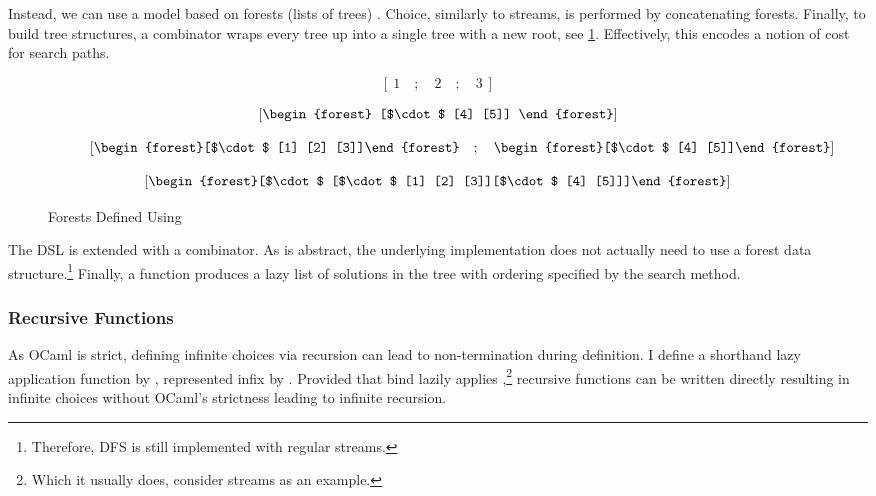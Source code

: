 Instead, we can use a model based on forests (lists of trees) \cite{Bunches}. Choice, similarly to streams, is performed by concatenating forests. Finally, to build tree structures, a  combinator wraps every tree up into a single tree with a new root, see \cref{fig:Wrap}. Effectively, this encodes a  notion of cost for search paths.

\begin{figure}[h]
\centering
\begin{subfigure}{0.45\textwidth}
\centering
\[\left[\ 1\quad ; \quad 2 \quad ; \quad 3\ \right]\]
\caption{  }
\end{subfigure}
\begin{subfigure}{0.45\textwidth}
\centering
\[\left[\vcenter{\hbox{\begin{forest}
[$\cdot$ [4] [5]]
\end{forest}}}\right]\]
\caption{}
\end{subfigure}
\begin{subfigure}{0.45\textwidth}
\centering
\[\left[\vcenter{\hbox{\begin{forest}[$\cdot$ [1] [2] [3]]\end{forest}}} \quad ; \quad\vcenter{\hbox{\begin{forest}[$\cdot$ [4] [5]]\end{forest}}}\right]\]
\caption{}
\end{subfigure}
\begin{subfigure}{0.45\textwidth}
\centering
\[\left[\vcenter{\hbox{\begin{forest}[$\cdot$ [$\cdot$ [1] [2] [3]][$\cdot$ [4] [5]]]\end{forest}}}\right]\]
\caption{}
\end{subfigure}
\caption{Forests Defined Using }
\label{fig:Wrap}
\end{figure}

The DSL is extended with a  combinator. As  is abstract, the underlying implementation does not actually need to use a forest data structure.\footnote{Therefore, DFS is still implemented with regular streams.} 
Finally, a  function produces a lazy list of solutions in the tree with ordering specified by the search method.

\subsubsection{Recursive Functions}
As OCaml is strict, defining infinite choices via recursion can lead to non-termination during definition. I define a shorthand lazy application function  by , represented infix by \code{|>-}. Provided that bind lazily applies ,\footnote{Which it usually does, consider streams as an example.} recursive functions can be written directly resulting in infinite choices without OCaml's strictness leading to infinite recursion.

